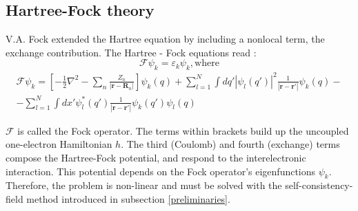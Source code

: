 \subsection{Hartree-Fock theory}

V.A. Fock extended the Hartree equation by including a nonlocal term, the exchange contribution. The Hartree - Fock equations read \cite{szabo,mcweeny}: 
\begin{equation}
	\mathcal{F}\psi_k = \varepsilon_k \psi_k,
	\mathrm{where}
	\label{eq:short_HF}
\end{equation}
\begin{multline}
	\mathcal{F}\psi_k = \left[-\frac{1}{2}\nabla^2 - \sum_n\frac{Z_n}{\left|\mathbf{r}-\mathbf{R}_n\right|}\right]\psi_k(q) + \sum_{l=1}^N\int{dq'\left|\psi_l(q')\right|^2\frac{1}{\left|\mathbf{r}-\mathbf{r'}\right|}\psi_k(q)} -\\ -\sum_{l =1}^N\int{dx'\psi_l^*(q')\frac{1}{\left|\mathbf{r}-\mathbf{r'}\right|}\psi_k(q')\psi_l(q)}
	\label{eq:Hartree_Fock}
\end{multline}

$\mathcal{F}$ is called the Fock operator. The terms within brackets build up the uncoupled one-electron Hamiltonian $h$. The third (Coulomb) and fourth (exchange) terms compose the Hartree-Fock potential, and respond to the interelectronic interaction. This potential depends on the Fock operator's eigenfunctions $\psi_k$. Therefore, the problem is non-linear and must be solved with the self-consistency-field method introduced in subsection \ref{preliminaries}. %

